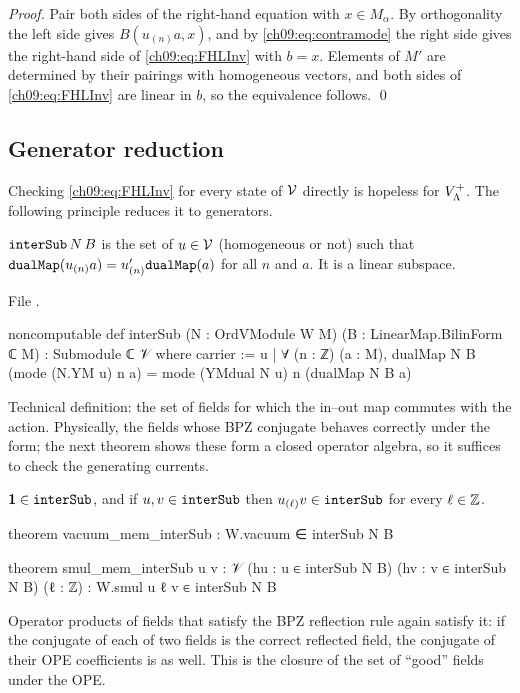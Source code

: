 \noindent\emph{Proof.} Pair both sides of the right-hand equation with $x\in M_\alpha$. By
orthogonality the left side gives $B(u_{(n)}a,x)$, and by \eqref{ch09:eq:contramode} the right side
gives the right-hand side of \eqref{ch09:eq:FHLInv} with $b=x$. Elements of $M'$ are determined by
their pairings with homogeneous vectors, and both sides of \eqref{ch09:eq:FHLInv} are linear in
$b$, so the equivalence follows. \qed

\subsection{Generator reduction}

Checking \eqref{ch09:eq:FHLInv} for every state of $\mathcal{V}$ directly is hopeless for $V_{\Lambda}^{+}$.
The following principle reduces it to generators.

\begin{definition}\label{ch09:def:interSub}
$\lean{interSub}\,N\,B$ is the set of $u\in\mathcal{V}$ (homogeneous or not) such that
$\lean{dualMap}(u_{(n)}a)=u'_{(n)}\lean{dualMap}(a)$ for all $n$ and $a$. It is a linear subspace.
\end{definition}
\noindent File .
\begin{leancode}
noncomputable def interSub (N : OrdVModule W M) (B : LinearMap.BilinForm ℂ M) : Submodule ℂ 𝒱 where
  carrier := {u | ∀ (n : ℤ) (a : M),
    dualMap N B (mode (N.YM u) n a) = mode (YMdual N u) n (dualMap N B a)}
\end{leancode}

\begin{physics}
Technical definition: the set of fields for which the in--out map commutes with the action. Physically, the fields whose BPZ conjugate behaves correctly under the form; the next theorem shows these form a closed operator algebra, so it suffices to check the generating currents.
\end{physics}

\begin{theorem}\label{ch09:thm:interSub}
$\mathbf1\in\lean{interSub}$, and if $u,v\in\lean{interSub}$ then $u_{(\ell)}v\in\lean{interSub}$
for every $\ell\in{\mathbb{Z}}$.
\end{theorem}
\begin{leancode}
theorem vacuum_mem_interSub : W.vacuum ∈ interSub N B

theorem smul_mem_interSub {u v : 𝒱} (hu : u ∈ interSub N B) (hv : v ∈ interSub N B) (ℓ : ℤ) :
    W.smul u ℓ v ∈ interSub N B
\end{leancode}
\begin{physics}
Operator products of fields that satisfy the BPZ reflection rule again satisfy it: if the conjugate of each of two fields is the correct reflected field, the conjugate of their OPE coefficients is as well. This is the closure of the set of ``good'' fields under the OPE.
\end{physics}

